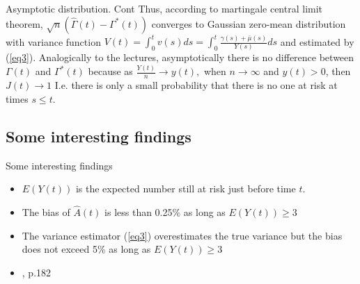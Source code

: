 \documentclass{beamer}
\begin{document}
\begin{frame}{Asymptotic distribution. Cont}
Thus, according to martingale central limit theorem, $\sqrt{n}(\hat\Gamma(t) - \Gamma^*(t))$ converges to Gaussian zero-mean distribution with variance function $V(t) = \int_0^t v(s) ds = \int_0^t \frac{\gamma(s) + \bar\mu(s)}{Y(s)}ds$ and estimated by (\ref{eq3}).
\newline
\newline
Analogically to the lectures, asymptotically there is no difference between $\Gamma(t)$ and $\Gamma^*(t)$ because as $\frac{Y(t)}{n} \rightarrow y(t),$ when $n \rightarrow \infty$ and $y(t) > 0$, then $J(t) \rightarrow 1$ 
\newline   
\newline
I.e. there is only a small probability that there is no one at risk at times $s \leq t$.
\end{frame}

\subsection{Some interesting findings}
\begin{frame}{Some interesting findings}
\begin{itemize}
\item $E(Y(t))$ is the expected number still at risk just before time $t$. 
    \item The bias of $\hat A(t)$ is less than 0.25\% as long as $E(Y(t)) \geq 3$
    \item The variance estimator (\ref{eq3}) overestimates the true variance but the bias does not exceed 5\%  as long as $E(Y(t)) \geq 3$ 
    \item \cite{andersen}, p.182
\end{itemize} 
   
\end{frame}
\end{document}
